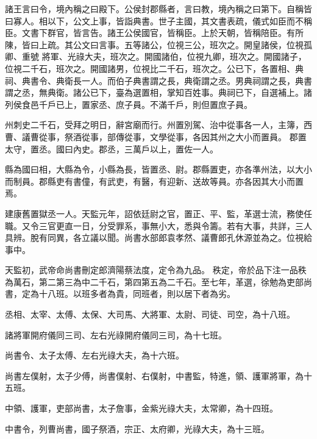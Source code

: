 \begin{pinyinscope}
 諸王言曰令，境內稱之曰殿下。公侯封郡縣者，言曰教，境內稱之曰第下。自稱皆曰寡人。相以下，公文上事，皆詣典書。世子主國，其文書表疏，儀式如臣而不稱臣。文書下群官，皆言告。諸王公侯國官，皆稱臣。上於天朝，皆稱陪臣。有所陳，皆曰上疏。其公文曰言事。五等諸公，位視三公，班次之。開皇諸侯，位視孤卿、重號
 將軍、光祿大夫，班次之。開國諸伯，位視九卿，班次之。開國諸子，位視二千石，班次之。開國諸男，位視比二千石，班次之。公已下，各置相、典祠、典書令、典衛長一人。而伯子典書謂之長，典衛謂之丞。男典祠謂之長，典書謂之丞，無典衛。諸公已下，臺為選置相，掌知百姓事。典祠已下，自選補上。諸列侯食邑千戶已上，置家丞、庶子員。不滿千戶，則但置庶子員。



 州刺史二千石，受拜之明日，辭宮廟而行。州置別駕、治中從事各一人，主簿，西曹、議曹從事，祭酒從事，部傳從事，文學從事，各因其州之大小而置員。
 郡置太守，置丞。國曰內史。郡丞，三萬戶以上，置佐一人。



 縣為國曰相，大縣為令，小縣為長，皆置丞、尉。郡縣置吏，亦各準州法，以大小而制員。郡縣吏有書僮，有武吏，有醫，有迎新、送故等員。亦各因其大小而置焉。



 建康舊置獄丞一人。天監元年，詔依廷尉之官，置正、平、監，革選士流，務使任職。又令三官更直一日，分受罪系，事無小大，悉與令籌。若有大事，共詳，三人具辨。脫有同異，各立議以聞。尚書水部郎袁孝然、議曹郎孔休源並為之。位視給事中。



 天監初，武帝命尚書刪定郎濟陽蔡法度，定令為九品。
 秩定，帝於品下注一品秩為萬石，第二第三為中二千石，第四第五為二千石。至七年，革選，徐勉為吏部尚書，定為十八班。以班多者為貴，同班者，則以居下者為劣。



 丞相、太宰、太傅、太保、大司馬、大將軍、太尉、司徒、司空，為十八班。



 諸將軍開府儀同三司、左右光祿開府儀同三司，為十七班。



 尚書令、太子太傅、左右光祿大夫，為十六班。



 尚書左僕射，太子少傅，尚書僕射、右僕射，中書監，特進，領、護軍將軍，為十五班。



 中領、護軍，吏部尚書，太子詹事，金紫光祿大夫，太常卿，為十四班。



 中書令，列曹尚書，國子祭酒，宗正、太府卿，光祿大夫，為十三班。




\end{pinyinscope}
